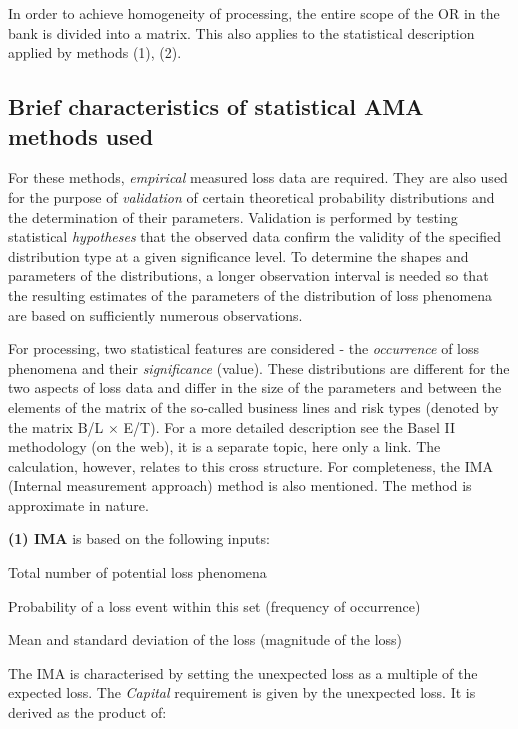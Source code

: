 \documentclass{article}
\begin{document}
In order to achieve homogeneity of processing, the entire scope of the OR in the bank is divided into a matrix. This also applies to the statistical description applied by methods (1), (2).

\subsection{Brief characteristics of statistical AMA methods used}


For these methods, \emph{empirical} measured loss data are required. They are also used for the purpose of \emph{validation} of certain theoretical probability distributions and the determination of their parameters. Validation is performed by testing statistical \emph{hypotheses} that the observed data confirm the validity of the specified distribution type at a given significance level. To determine the shapes and parameters of the distributions, a longer observation interval is needed so that the resulting estimates of the parameters of the distribution of loss phenomena are based on sufficiently numerous observations.

For processing, two statistical features are considered - the \emph{occurrence} of loss phenomena and their \emph{significance} (value). These distributions are different for the two aspects of loss data and differ in the size of the parameters and between the elements of the matrix of the so-called business lines and risk types (denoted by the matrix B/L $\times$ E/T). For a more detailed description see the Basel II methodology (on the web), it is a separate topic, here only a link. The calculation, however, relates to this cross structure. For completeness, the IMA (Internal measurement approach) method is also mentioned. The method is approximate in nature.

\textbf{(1) IMA} is based on the following inputs:

\begin{compactitem}
    \item Total number of potential loss phenomena
    \item Probability of a loss event within this set (frequency of occurrence)
    \item Mean and standard deviation of the loss (magnitude of the loss)
\end{compactitem}

The IMA is characterised by setting the unexpected loss as a multiple of the expected loss. The \emph{Capital} requirement is given by the unexpected loss. It is derived as the product of:
\end{document}

